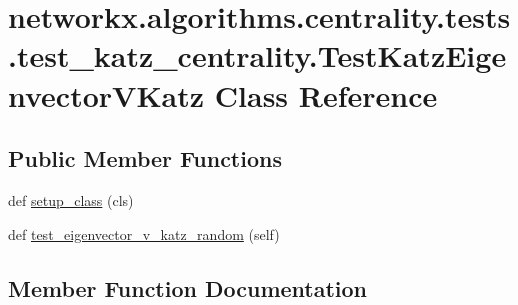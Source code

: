 \hypertarget{classnetworkx_1_1algorithms_1_1centrality_1_1tests_1_1test__katz__centrality_1_1TestKatzEigenvectorVKatz}{}\section{networkx.\+algorithms.\+centrality.\+tests.\+test\+\_\+katz\+\_\+centrality.\+Test\+Katz\+Eigenvector\+V\+Katz Class Reference}
\label{classnetworkx_1_1algorithms_1_1centrality_1_1tests_1_1test__katz__centrality_1_1TestKatzEigenvectorVKatz}
\subsection*{Public Member Functions}
\begin{DoxyCompactItemize}
\item 
def \hyperlink{classnetworkx_1_1algorithms_1_1centrality_1_1tests_1_1test__katz__centrality_1_1TestKatzEigenvectorVKatz_aa1e2ccfdfbd4786031e489beb1ebea23}{setup\+\_\+class} (cls)
\item 
def \hyperlink{classnetworkx_1_1algorithms_1_1centrality_1_1tests_1_1test__katz__centrality_1_1TestKatzEigenvectorVKatz_aa09133adeb19ed3d6bde500ed4dacb28}{test\+\_\+eigenvector\+\_\+v\+\_\+katz\+\_\+random} (self)
\end{DoxyCompactItemize}


\subsection{Member Function Documentation}
\mbox{\label{classnetworkx_1_1algorithms_1_1centrality_1_1tests_1_1test__katz__centrality_1_1TestKatzEigenvectorVKatz_aa1e2ccfdfbd4786031e489beb1ebea23}} 
